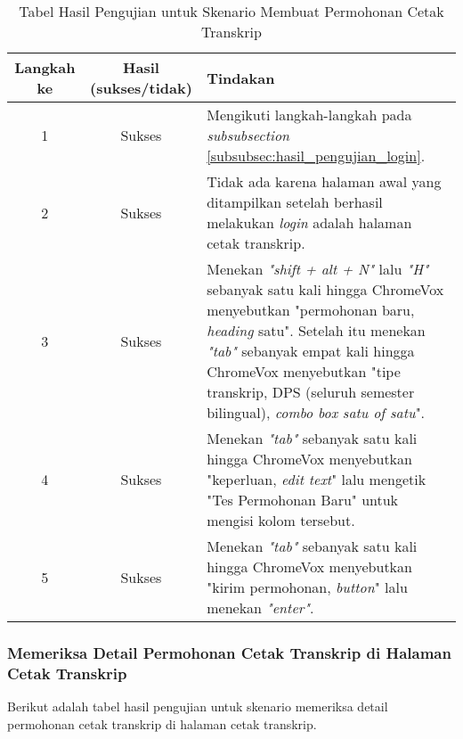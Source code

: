 \begin{table}[H]
    \centering 
    \caption{Tabel Hasil Pengujian untuk Skenario Membuat Permohonan Cetak Transkrip}
    \label{tab:hasil_pengujian_membuat_permohonan_cetak_transkrip}
    \begin{tabular}{|c|c|p{10cm}|}
        \toprule
        Langkah ke & Hasil (sukses/tidak) & Tindakan \\

        \midrule
        1 & Sukses & Mengikuti langkah-langkah pada \textit{subsubsection} \ref{subsubsec:hasil_pengujian_login}. \\
        2 & Sukses & Tidak ada karena halaman awal yang ditampilkan setelah berhasil melakukan \textit{login} adalah halaman cetak transkrip. \\
        3 & Sukses & Menekan \textit{"shift + alt + N"} lalu \textit{"H"} sebanyak satu kali hingga ChromeVox menyebutkan "permohonan baru, \textit{heading} satu". Setelah itu menekan \textit{"tab"} sebanyak empat kali hingga ChromeVox menyebutkan "tipe transkrip, DPS (seluruh semester bilingual), \textit{combo box satu of satu}". \\
        4 & Sukses & Menekan \textit{"tab"} sebanyak satu kali hingga ChromeVox menyebutkan "keperluan, \textit{edit text}" lalu mengetik "Tes Permohonan Baru" untuk mengisi kolom tersebut. \\
        5 & Sukses & Menekan \textit{"tab"} sebanyak satu kali hingga ChromeVox menyebutkan "kirim permohonan, \textit{button}" lalu menekan \textit{"enter"}. \\

        \bottomrule

    \end{tabular}
\end{table}

\subsubsection{Memeriksa Detail Permohonan Cetak Transkrip di Halaman Cetak Transkrip}
\label{subsubsec:hasil_pengujian_memeriksa_detail_permohonan_cetak_transkrip_di_halaman_cetak_transkrip}
Berikut adalah tabel hasil pengujian untuk skenario memeriksa detail permohonan cetak transkrip di halaman cetak transkrip.

